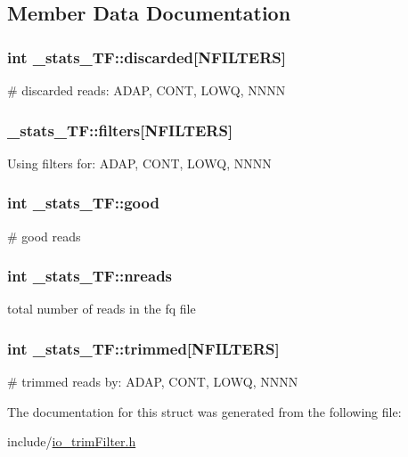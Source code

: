 \subsection{Member Data Documentation}
\hypertarget{struct__stats__TF_a876a430dbbb78e3b03f9e7088da26618}{
\subsubsection[{discarded}]{\setlength{\rightskip}{0pt plus 5cm}int \+\_\+stats\+\_\+\+T\+F\+::discarded\mbox{[}{\bf N\+F\+I\+L\+T\+E\+R\+S}\mbox{]}}}\label{struct__stats__TF_a876a430dbbb78e3b03f9e7088da26618}
\# discarded reads\+: A\+D\+A\+P, C\+O\+N\+T, L\+O\+W\+Q, N\+N\+N\+N \hypertarget{struct__stats__TF_a5f5b0402d226910a834373a684eb6f07}{
\subsubsection[{filters}]{ \+\_\+stats\+\_\+\+T\+F\+::filters\mbox{[}{\bf N\+F\+I\+L\+T\+E\+R\+S}\mbox{]}}}\label{struct__stats__TF_a5f5b0402d226910a834373a684eb6f07}
Using filters for\+: A\+D\+A\+P, C\+O\+N\+T, L\+O\+W\+Q, N\+N\+N\+N \hypertarget{struct__stats__TF_a4d36ddc878d561051a0f9464df2e0911}{
\subsubsection[{good}]{\setlength{\rightskip}{0pt plus 5cm}int \+\_\+stats\+\_\+\+T\+F\+::good}}\label{struct__stats__TF_a4d36ddc878d561051a0f9464df2e0911}
\# good reads \hypertarget{struct__stats__TF_a2a3993588191eb9f03416cce4fb1862f}{
\subsubsection[{nreads}]{\setlength{\rightskip}{0pt plus 5cm}int \+\_\+stats\+\_\+\+T\+F\+::nreads}}\label{struct__stats__TF_a2a3993588191eb9f03416cce4fb1862f}
total number of reads in the fq file \hypertarget{struct__stats__TF_a399de2eb5fd452f019d5c8d23bae0651}{
\subsubsection[{trimmed}]{\setlength{\rightskip}{0pt plus 5cm}int \+\_\+stats\+\_\+\+T\+F\+::trimmed\mbox{[}{\bf N\+F\+I\+L\+T\+E\+R\+S}\mbox{]}}}\label{struct__stats__TF_a399de2eb5fd452f019d5c8d23bae0651}
\# trimmed reads by\+: A\+D\+A\+P, C\+O\+N\+T, L\+O\+W\+Q, N\+N\+N\+N 

The documentation for this struct was generated from the following file\+:\begin{DoxyCompactItemize}
\item 
include/\hyperlink{io__trimFilter_8h}{io\+\_\+trim\+Filter.\+h}\end{DoxyCompactItemize}

